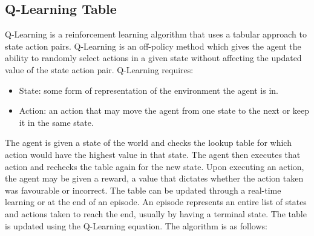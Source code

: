 

\subsection{Q-Learning Table}

Q-Learning is a reinforcement learning algorithm that uses a tabular approach to
state action pairs. Q-Learning is an off-policy method which gives the agent the
ability to randomly select actions in a given state without affecting the
updated value of the state action pair. Q-Learning requires:

\begin{itemize}
    \item State: some form of representation of the environment the agent is in.
    \item Action: an action that may move the agent from one state to the next
        or keep it in the same state.
\end{itemize}

The agent is given a state of the world and checks the lookup table for which
action would have the highest value in that state. The agent then executes that
action and rechecks the table again for the new state. Upon executing an action,
the agent may be given a reward, a value that dictates whether the action taken
was favourable or incorrect. The table can be updated through a real-time
learning or at the end of an episode. An episode represents an entire list of
states and actions taken to reach the end, usually by having a terminal state.
The table is updated using the Q-Learning equation. The algorithm is as follows:

